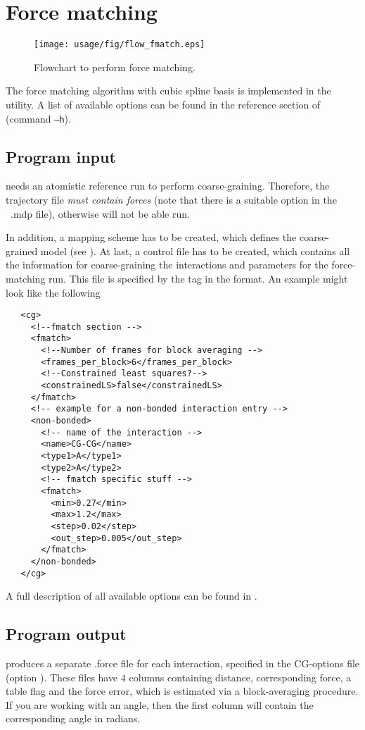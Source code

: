 \chapter{Force matching}
\begin{figure}
   \centering
   \texttt{[image: usage/fig/flow\_fmatch.eps]}
   \caption{Flowchart to perform force matching.}
\end{figure}
The force matching algorithm with cubic spline basis is implemented in the  utility. A list of available options can be found in the reference section of  (command \texttt{--h}).

\section{Program input}
 needs an atomistic reference run to perform coarse-graining. Therefore, the trajectory file {\em must contain forces } (note that there is a suitable option in the \gromacs ~.mdp file), otherwise  will not be able run.

In addition, a mapping scheme has to be created, which defines the coarse-grained model (see ). At last, a control file has to be created, which contains all the information for coarse-graining the interactions and parameters for the force-matching run. This file is specified by the tag  in the \xml format. An example might look like the following
\begin{lstlisting}
   <cg>
     <!--fmatch section -->
     <fmatch>
       <!--Number of frames for block averaging -->
       <frames_per_block>6</frames_per_block>
       <!--Constrained least squares?-->
       <constrainedLS>false</constrainedLS>
     </fmatch>
     <!-- example for a non-bonded interaction entry -->
     <non-bonded>
       <!-- name of the interaction -->
       <name>CG-CG</name>
       <type1>A</type1>
       <type2>A</type2>
       <!-- fmatch specific stuff -->
       <fmatch>
         <min>0.27</min>
         <max>1.2</max>
         <step>0.02</step>
         <out_step>0.005</out_step>
       </fmatch>
     </non-bonded>
   </cg>
\end{lstlisting}
A full description of all available options can be found in .

\section{Program output}
 produces a separate .force file for each interaction, specified in the CG-options file (option ).
These files have 4 columns containing distance, corresponding force, a table flag and the force error, which is estimated via a block-averaging procedure.
If you are working with an angle, then the first column will contain the corresponding angle in radians.

